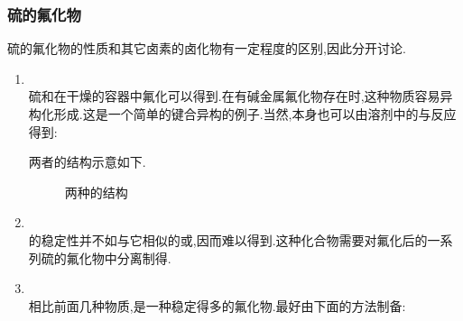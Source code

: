 \documentclass{ctexart}
\begin{document}
\subsubsection{硫的氟化物} 硫的氟化物的性质和其它卤素的卤化物有一定程度的区别,因此分开讨论.
\begin{enumerate}[label=\tbf{\arabic*},topsep=0pt,parsep=0pt,itemsep=0pt,partopsep=0pt]
    \item {}\\
        硫和在干燥的容器中氟化可以得到.在有碱金属氟化物存在时,这种物质容易异构化形成.这是一个简单的键合异构的例子.当然,本身也可以由溶剂中的与反应得到:
        \begin{center}
        \end{center}
        两者的结构示意如下.
        \begin{figure}[H]
            \centering
            \caption{两种的结构}
        \end{figure}
    \item {}\\
        \indent {}的稳定性并不如与它相似的或,因而难以得到.这种化合物需要对氟化后的一系列硫的氟化物中分离制得.
    \item {}\\
        \indent 相比前面几种物质,是一种稳定得多的氟化物.最好由下面的方法制备:

\end{enumerate}
\end{document}
